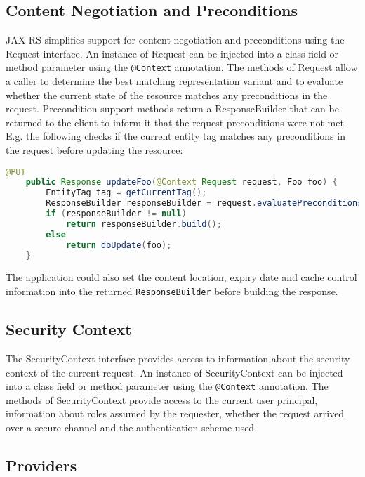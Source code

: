 \subsection{Content Negotiation and Preconditions}
\label{conneg_and_preconditions}

JAX-RS simplifies support for content negotiation and preconditions using the Request interface. An instance of Request
can be injected into a class field or method parameter using the \lstinline{@Context} annotation. The methods of Request
allow a caller to determine the best matching representation variant and to evaluate whether the current state of the
resource matches any preconditions in the request. Precondition support methods return a ResponseBuilder that can be
returned to the client to inform it that the request preconditions were not met. E.g. the following checks if the
current entity tag matches any preconditions in the request before updating the resource:

\begin{lstlisting}[language=Java]
    @PUT
    public Response updateFoo(@Context Request request, Foo foo) {
        EntityTag tag = getCurrentTag();
        ResponseBuilder responseBuilder = request.evaluatePreconditions(tag);
        if (responseBuilder != null)
            return responseBuilder.build();
        else
            return doUpdate(foo);
    }
\end{lstlisting}

The application could also set the content location, expiry date and cache control information into the returned
\lstinline{ResponseBuilder} before building the response.

\subsection{Security Context}
\label{security_context}

The SecurityContext interface provides access to information about the security context of the current request. An
instance of SecurityContext can be injected into a class field or method parameter using the \lstinline{@Context}
annotation. The methods of SecurityContext provide access to the current user principal, information about roles assumed
by the requester, whether the request arrived over a secure channel and the authentication scheme used.

\subsection{Providers}
\label{providercontext}

